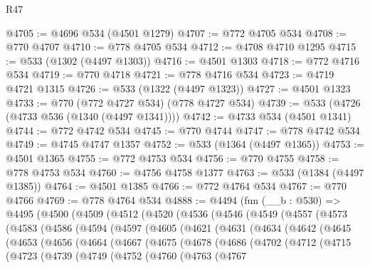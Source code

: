 \begin{lexlean}{R47}
\begin{coremodule}
@4705 := @4696 @534 (@4501 @1279)
@4707 := @772 @4705 @534
@4708 := @770 @4707
@4710 := @778 @4705 @534
@4712 := @4708 @4710 @1295
@4715 := @533 (@1302 (@4497 @1303))
@4716 := @4501 @1303
@4718 := @772 @4716 @534
@4719 := @770 @4718
@4721 := @778 @4716 @534
@4723 := @4719 @4721 @1315
@4726 := @533 (@1322 (@4497 @1323))
@4727 := @4501 @1323
@4733 := @770 (@772 @4727 @534) (@778 @4727 @534)
@4739 := @533 (@4726 (@4733 @536 (@1340 (@4497 @1341))))
@4742 := @4733 @534 (@4501 @1341)
@4744 := @772 @4742 @534
@4745 := @770 @4744
@4747 := @778 @4742 @534
@4749 := @4745 @4747 @1357
@4752 := @533 (@1364 (@4497 @1365))
@4753 := @4501 @1365
@4755 := @772 @4753 @534
@4756 := @770 @4755
@4758 := @778 @4753 @534
@4760 := @4756 @4758 @1377
@4763 := @533 (@1384 (@4497 @1385))
@4764 := @4501 @1385
@4766 := @772 @4764 @534
@4767 := @770 @4766
@4769 := @778 @4764 @534
@4888 := @4494
    (fun (__b : @530) =>
    @4495
      (@4500
        (@4509
          (@4512
            (@4520
              (@4536
                (@4546
                  (@4549
                    (@4557
                      (@4573
                        (@4583
                          (@4586
                            (@4594
                              (@4597
                                (@4605
                                  (@4621
                                    (@4631
                                      (@4634
                                        (@4642
                                          (@4645
                                            (@4653
                                              (@4656
                                                (@4664
                                                  (@4667
                                                    (@4675
                                                      (@4678
                                                        (@4686
                                                          (@4702
                                                            (@4712
                                                              (@4715
                                                                (@4723
                                                                  (@4739
                                                                    (@4749
                                                                      (@4752
                                                                        (@4760
                                                                          (@4763
                                                                            (@4767

\end{coremodule}
\end{lexlean}
